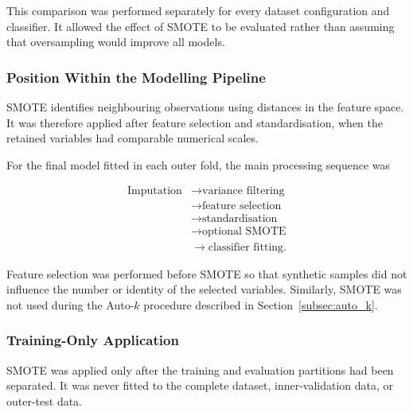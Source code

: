 \documentclass[12pt,twocolumn]{article}
\begin{document}
This comparison was performed separately for every dataset
configuration and classifier. It allowed the effect of SMOTE to be
evaluated rather than assuming that oversampling would improve all
models.










\subsubsection{Position Within the Modelling Pipeline}
\label{subsubsec:smote_pipeline_position}

SMOTE identifies neighbouring observations using distances in the
feature space. It was therefore applied after feature selection and
standardisation, when the retained variables had comparable numerical
scales.

For the final model fitted in each outer fold, the main processing
sequence was

\begin{equation}
\begin{aligned}
\text{Imputation}
&\longrightarrow
\text{variance filtering}\\
&\longrightarrow
\text{feature selection}\\
&\longrightarrow
\text{standardisation}\\
&\longrightarrow
\text{optional SMOTE}\\
&\longrightarrow
\text{classifier fitting}.
\end{aligned}
\label{eq:smote_pipeline_order}
\end{equation}

Feature selection was performed before SMOTE so that synthetic samples
did not influence the number or identity of the selected variables.
Similarly, SMOTE was not used during the Auto-\(k\) procedure described
in Section~\ref{subsec:auto_k}.








\subsubsection{Training-Only Application}
\label{subsubsec:smote_training_only}

SMOTE was applied only after the training and evaluation partitions
had been separated. It was never fitted to the complete dataset,
inner-validation data, or outer-test data.
\end{document}
